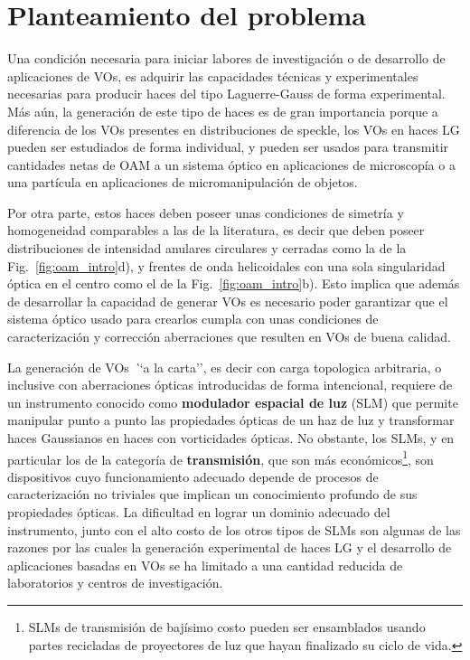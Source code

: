 \section{Planteamiento del problema}
\label{sec:planteamiento}

Una condición necesaria para iniciar labores de investigación o de desarrollo
de aplicaciones de VOs, es adquirir las capacidades técnicas y experimentales
necesarias para producir haces del tipo Laguerre-Gauss de forma
experimental. Más aún, la generación de este tipo de haces es de gran
importancia porque a diferencia de los VOs presentes en distribuciones de
speckle, los VOs en haces LG pueden ser estudiados de forma
individual, y pueden ser usados para transmitir cantidades netas de
OAM a un sistema óptico en aplicaciones de microscopía o a una
partícula en aplicaciones de micromanipulación de objetos. 

Por otra parte, estos haces deben poseer unas
condiciones de simetría y homogeneidad comparables a las de la
literatura, es decir que deben poseer distribuciones de intensidad anulares
circulares y cerradas como la de la Fig.~\ref{fig:oam_intro}d), y
frentes de onda helicoidales con una sola singularidad óptica en el
centro como el de la Fig.~\ref{fig:oam_intro}b). Esto implica que
además de desarrollar la capacidad de generar VOs es necesario poder
garantizar que el sistema óptico usado para crearlos cumpla con unas condiciones de
caracterización y corrección aberraciones que resulten en VOs
de buena calidad. 
 
La generación  de VOs \textit ``a la carta'', es decir
con carga topologica arbitraria, o inclusive con aberraciones ópticas
introducidas de forma intencional, requiere de un instrumento conocido
como \textbf{modulador espacial de luz}
(\acrshort{SLM}) que permite manipular punto a punto las
propiedades ópticas de un haz de luz y transformar haces Gaussianos en
haces con vorticidades ópticas. No obstante, los SLMs, y en
particular los de la categoría de \textbf{transmisión}, que son más económicos\footnote{SLMs
  de transmisión de bajísimo costo pueden ser ensamblados usando
  partes recicladas de proyectores de luz que hayan finalizado su
  ciclo de vida.}, son
dispositivos cuyo funcionamiento adecuado depende de procesos de
caracterización no triviales que implican un conocimiento profundo de
sus propiedades ópticas. La dificultad en lograr un dominio
adecuado del instrumento, junto con el alto costo de los otros tipos
de SLMs son algunas de las
razones por las cuales la generación experimental de haces LG y el
desarrollo de aplicaciones basadas en VOs se ha limitado a una
cantidad reducida de laboratorios y centros de investigación. 

